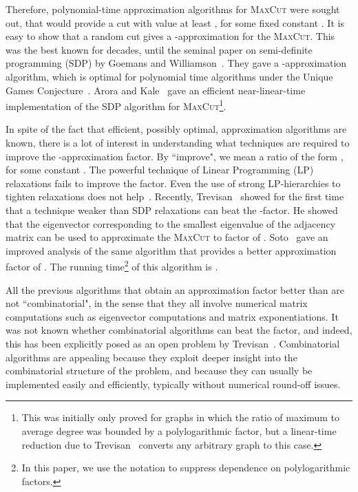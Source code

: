 \documentclass[11pt]{article}
\def\maxcut{\textsc{MaxCut}\xspace}
\begin{document}
Therefore, polynomial-time approximation algorithms for \maxcut were sought out, that would provide a cut with value at least ,
for some fixed constant . It is easy to show that a random cut
gives a -approximation for the \maxcut. This was the best known
for decades, until the seminal paper on semi-definite programming (SDP) by Goemans and Williamson~\cite{GW95}. They gave a -approximation algorithm, which is optimal for polynomial time algorithms under the Unique Games Conjecture~\cite{Kho02,KKMO04}. Arora and Kale~\cite{AK07} gave an efficient near-linear-time implementation of the SDP algorithm for \maxcut\footnote{This was initially only proved for graphs in which the ratio of maximum to average degree was bounded by a polylogarithmic factor, but a linear-time reduction due to Trevisan~\cite{Tre09} converts any arbitrary graph to this case.}.

In spite of the fact that efficient, possibly optimal, approximation algorithms are known, there is a lot of interest in understanding what techniques are required to improve the -approximation factor. By ``improve", we mean a ratio of the form , for some constant . The powerful technique of Linear Programming (LP) relaxations fails to improve the  factor. Even the use of strong LP-hierarchies to tighten relaxations does not help~\cite{dlVKM07,STT07}. Recently, Trevisan~\cite{Tre09} showed for the first time that a technique weaker than SDP relaxations can beat the -factor. He showed that the eigenvector corresponding to the smallest eigenvalue of the adjacency matrix can be used to approximate the \maxcut to factor of .
Soto~\cite{Sot09} gave an improved analysis of the same algorithm that provides a better approximation factor of . The running time\footnote{In this paper, we use the  notation to suppress dependence on polylogarithmic factors.} of this algorithm is .

All the previous algorithms that obtain an approximation factor better than  are not ``combinatorial", in the sense that they all involve numerical matrix computations such as eigenvector computations and matrix exponentiations. It was not known whether combinatorial algorithms can beat the  factor, and indeed, this has been explicitly posed as an open problem
by Trevisan~\cite{Tre09}. Combinatorial algorithms are appealing because they exploit deeper insight into the combinatorial structure of the problem, and because they can usually be implemented easily and efficiently, typically without numerical round-off issues.
\end{document}
